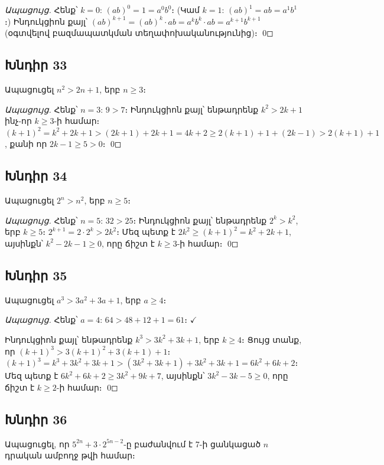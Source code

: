 \textit{Ապացույց.} Հենք՝ $k=0$: $(ab)^0 = 1 = a^0 b^0$։ (Կամ $k=1$: $(ab)^1 = ab = a^1 b^1$։)
Ինդուկցիոն քայլ՝ $(ab)^{k+1} = (ab)^k \cdot ab = a^k b^k \cdot ab = a^{k+1} b^{k+1}$ (օգտվելով բազմապատկման տեղափոխականությունից)։ \qed

\subsection*{Խնդիր 33}
Ապացուցել $n^2 > 2n + 1$, երբ $n \ge 3$։

\textit{Ապացույց.} Հենք՝ $n=3$: $9 > 7$։ Ինդուկցիոն քայլ՝ ենթադրենք $k^2 > 2k+1$ ինչ-որ $k \ge 3$-ի համար։
$(k+1)^2 = k^2 + 2k + 1 > (2k+1) + 2k + 1 = 4k + 2 \ge 2(k+1) + 1 + (2k-1) > 2(k+1)+1$, 
քանի որ $2k - 1 \ge 5 > 0$։ \qed

\subsection*{Խնդիր 34}
Ապացուցել $2^n > n^2$, երբ $n \ge 5$։

\textit{Ապացույց.} Հենք՝ $n=5$: $32 > 25$։ Ինդուկցիոն քայլ՝ ենթադրենք $2^k > k^2$, երբ $k \ge 5$։
$2^{k+1} = 2 \cdot 2^k > 2k^2$։ Մեզ պետք է $2k^2 \ge (k+1)^2 = k^2 + 2k + 1$, այսինքն՝ $k^2 - 2k - 1 \ge 0$, որը ճիշտ է $k \ge 3$-ի համար։ \qed

\subsection*{Խնդիր 35}
Ապացուցել $a^3 > 3a^2 + 3a + 1$, երբ $a \ge 4$։

\textit{Ապացույց.} Հենք՝ $a=4$: $64 > 48 + 12 + 1 = 61$։ $\checkmark$

Ինդուկցիոն քայլ՝ ենթադրենք $k^3 > 3k^2 + 3k + 1$, երբ $k \ge 4$։ Ցույց տանք, որ $(k+1)^3 > 3(k+1)^2 + 3(k+1) + 1$։
$(k+1)^3 = k^3 + 3k^2 + 3k + 1 > (3k^2 + 3k + 1) + 3k^2 + 3k + 1 = 6k^2 + 6k + 2$։
Մեզ պետք է $6k^2 + 6k + 2 \ge 3k^2 + 9k + 7$, այսինքն՝ $3k^2 - 3k - 5 \ge 0$, որը ճիշտ է $k \ge 2$-ի համար։ \qed

\subsection*{Խնդիր 36}
Ապացուցել, որ $5^{2n} + 3 \cdot 2^{5n-2}$-ը բաժանվում է 7-ի ցանկացած $n$ դրական ամբողջ թվի համար։

